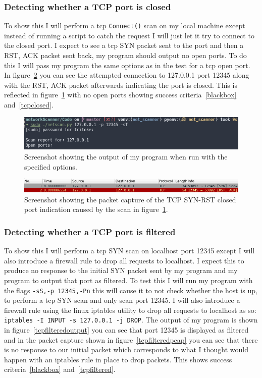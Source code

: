 \documentclass[titlepage]{article}
\let\Oldsubsubsection\subsubsection{}
\renewcommand{\subsubsection}{\FloatBarrier\Oldsubsubsection}
\begin{document}
\subsubsection{Detecting whether a TCP port is closed}
To show this I will perform a \gls{tcp} \verb|Connect()| scan
on my local machine except instead of running a script to catch the
request I will just let it try to connect to the closed port.
I expect to see a \gls{tcp} SYN packet sent to the port and then a RST, ACK
packet sent back, my program should output no open ports.
To do this I will pass my program the same options as in the test for
a \gls{tcp} open port.
In figure~\ref{tcpclosedpcap} you can see the attempted connection to
127.0.0.1 port 12345 along with the RST, ACK packet afterwards indicating
the port is closed. This is reflected in figure~\ref{tcpclosedoutput}
with no open ports showing success criteria~\ref{blackbox} and~\ref{tcpclosed}.
\begin{figure}[H]
  \centering
  \includegraphics[width=\textwidth]{tcpclosedoutput.png}
  \caption{%
    Screenshot showing the output of my program when run with the specified options.
  }\label{tcpclosedoutput}
\end{figure}

\begin{figure}[H]
  \centering
  \includegraphics[width=\textwidth]{tcpclosedpcap.png}
  \caption{%
    Screenshot showing the packet capture of the TCP SYN-RST closed port indication
    caused by the scan in figure~\ref{tcpclosedoutput}.
  }\label{tcpclosedpcap}
\end{figure}

\subsubsection{Detecting whether a TCP port is filtered}
To show this I will perform a \gls{tcp} SYN scan on localhost port 12345
except I will also introduce a firewall rule to drop all requests to localhost.
I expect this to produce no response to the initial SYN packet sent by my
program and my program to output that port as filtered. To test this I will
run my program with the flags \verb|-sS,-p 12345,-Pn| this will cause it to not
check whether the host is up, to perform a \gls{tcp} SYN scan and only scan port 12345.
I will also introduce a firewall rule using the linux iptables utility to drop
all requests to localhost as so: \verb|iptables -I INPUT -s 127.0.0.1 -j DROP|.
The output of my program is shown in figure~\ref{tcpfilteredoutput} you can
see that port 12345 is displayed as filtered and in the packet capture shown in
figure~\ref{tcpfilteredpcap} you can see that there is no response to our initial packet
which corresponds to what I thought would happen with an iptables rule in place
to drop packets. This shows success criteria~\ref{blackbox} and~\ref{tcpfiltered}.
\end{document}
